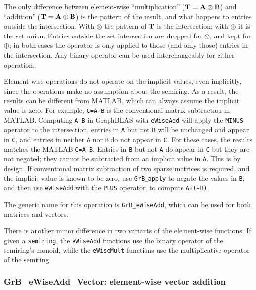 \documentclass[12pt]{article}
\begin{document}
The only difference between element-wise ``multiplication'' (${\bf T =A \otimes
B}$) and ``addition'' (${\bf T = A \oplus B}$) is the pattern of the result,
and what happens to entries outside the intersection.  With $\otimes$ the
pattern of ${\bf T}$ is the intersection; with $\oplus$ it is the set union.
Entries outside the set intersection are dropped for $\otimes$, and kept for
$\oplus$; in both cases the operator is only applied to those (and only those)
entries in the intersection.  Any binary operator can be used interchangeably
for either operation.

Element-wise operations do not operate on the implicit values, even implicitly,
since the operations make no assumption about the semiring.  As a result, the
results can be different from MATLAB, which can always assume the implicit
value is zero.  For example, \verb'C=A-B' is the conventional matrix
subtraction in MATLAB.  Computing \verb'A-B' in GraphBLAS with \verb'eWiseAdd'
will apply the \verb'MINUS' operator to the intersection, entries in \verb'A'
but not \verb'B' will be unchanged and appear in \verb'C', and entries in
neither \verb'A' nor \verb'B' do not appear in \verb'C'.  For these cases, the
results matches the MATLAB \verb'C=A-B'.  Entries in \verb'B' but not \verb'A'
do appear in \verb'C' but they are not negated; they cannot be subtracted from
an implicit value in \verb'A'.  This is by design.  If conventional matrix
subtraction of two sparse matrices is required, and the implicit value is known
to be zero, use \verb'GrB_apply' to negate the values in \verb'B', and then
use \verb'eWiseAdd' with the \verb'PLUS' operator, to compute \verb'A+(-B)'.

The generic name for this operation is \verb'GrB_eWiseAdd', which can be used
for both matrices and vectors.

There is another minor difference in two variants of the element-wise
functions.  If given a \verb'semiring', the \verb'eWiseAdd' functions use the
binary operator of the semiring's monoid, while the \verb'eWiseMult' functions
use the multiplicative operator of the semiring.

\subsubsection{{\sf GrB\_eWiseAdd\_Vector:} element-wise vector addition}
\label{eWiseAdd_vector}
\end{document}
